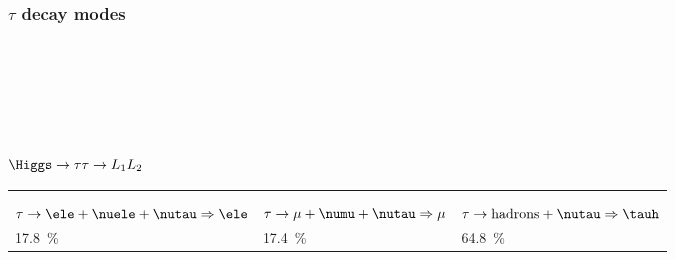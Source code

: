 \begin{frame}
\frametitle{$\tau$ decay modes}
~\hfill
\pause
\hfill
\pause
\hfill~

\vspace{5\baselineskip}

~\hfill

\hfill

\hfill~
\end{frame}

\begin{frame}
\frametitle{$\Higgs\to\tau\tau\to L_1L_2$}

\vspace{\baselineskip}

\begin{tabularx}{\linewidth}{YYY}

&

&

\\
&&\\
$\tau\to\ele+\nuele+\nutau\Rightarrow\ele$ & $\tau\to\mu+\numu+\nutau\Rightarrow\mu$ & $\tau\to\text{hadrons}+\nutau\Rightarrow\tauh$\\
\SI{17.8}{\%} & \SI{17.4}{\%} & \SI{64.8}{\%}
\end{tabularx}

\pause

\begin{minipage}[c]{.45\textwidth}
\begin{center}

\end{center}
\end{minipage}
\hfill\pause
\begin{minipage}[c]{.45\textwidth}
\begin{center}

\end{center}
\end{minipage}

\vspace{-\baselineskip}

\end{frame}
